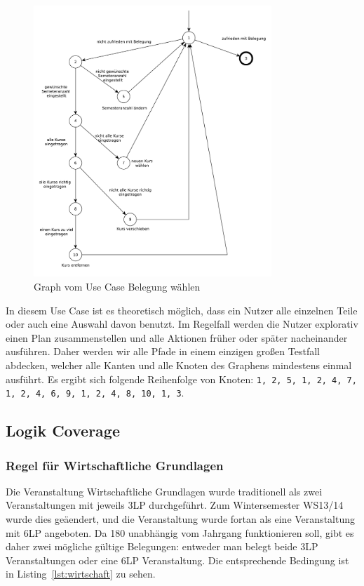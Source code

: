 \documentclass[ngerman]{article}
\begin{document}
\begin{figure}[h!]
\includegraphics[width=0.8\textwidth]{figures/belegung_waehlen_use_case.pdf}
\caption{Graph vom Use Case Belegung wählen}
\label{fig:graph_belegung_waehlen}
\end{figure}

In diesem Use Case ist es theoretisch möglich, dass ein Nutzer alle einzelnen Teile oder auch eine Auswahl davon benutzt. Im Regelfall werden die Nutzer explorativ einen Plan zusammenstellen und alle Aktionen früher oder später nacheinander ausführen.
Daher werden wir alle Pfade in einem einzigen großen Testfall abdecken, welcher alle Kanten und alle Knoten des Graphens mindestens einmal ausführt.
Es ergibt sich folgende Reihenfolge von Knoten:
\texttt{1, 2, 5, 1, 2, 4, 7, 1, 2, 4, 6, 9, 1, 2, 4, 8, 10, 1, 3}.


\subsection{Logik Coverage}

\subsubsection{Regel für Wirtschaftliche Grundlagen}
\label{sec:wirtschaft}

Die Veranstaltung Wirtschaftliche Grundlagen wurde traditionell als zwei Veranstaltungen mit jeweils 3LP durchgeführt.
Zum Wintersemester WS13/14 wurde dies geäendert, und die Veranstaltung wurde fortan als eine Veranstaltung mit 6LP angeboten.
Da 180 unabhängig vom Jahrgang funktionieren soll, gibt es daher zwei mögliche gültige Belegungen: entweder man belegt beide 3LP Veranstaltungen oder eine 6LP Veranstaltung.
Die entsprechende Bedingung ist in Listing~\ref{lst:wirtschaft} zu sehen.
\end{document}
